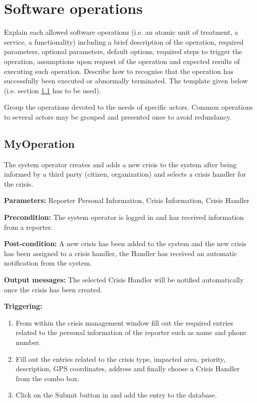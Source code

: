 \chapter{Software operations}
\label{chap:soptware_operations}


Explain each allowed software operations (i.e. an atomic unit of treatment, a service, a functionality) including a brief description of the operation, required parameters, optional parameters, default options, required steps to trigger the operation, assumptions upon request of the operation and expected results of executing such operation.
Describe how to recognise that the operation has successfully been executed or
abnormally terminated. The template given below (i.e. section \ref{operation:MyOperation} has to be used).

Group the operations devoted to the needs of specific actors. Common
operations to several actors may be grouped and presented once to avoid redundancy.


\section{MyOperation}
\label{operation:MyOperation}
The system operator creates and adds a new crisis to the system after being
informed by a third party (citizen, organization) and selects a crisis handler for the crisis.

\begin{description}

\item \textbf{Parameters:} Reporter Personal Information, Crisis Information, Crisis Handler
\item \textbf{Precondition:} The system operator is logged in and has received information from a reporter.
\item \textbf{Post-condition:} A new crisis has been added to the system and the new crisis has been assigned to a crisis handler, the Handler has received an automatic notification from the system.
\item \textbf{Output messages:} The selected Crisis Handler will be notified
automatically once the crisis has been created.

\item \textbf{Triggering:}
\begin{enumerate}
\item From within the crisis management window fill out the required entries related to the personal information of the reporter such as name and phone number.
\item Fill out the entries related to the crisis type, impacted area, priority, description, GPS coordinates, address and finally choose a Crisis Handler from the combo box.
\item Click on the Submit button in and add the entry to the database.
\end{enumerate}

 
\end{description}

